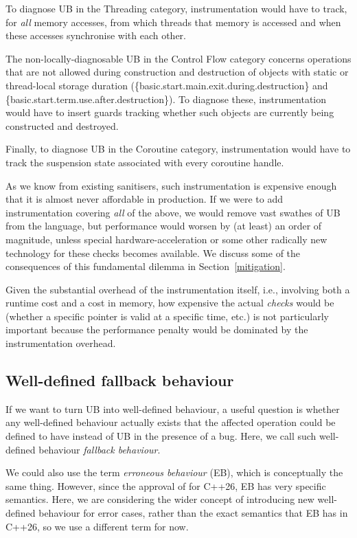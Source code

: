 To diagnose UB in the Threading category, instrumentation would have to track, for \emph{all} memory accesses, from which threads that memory is accessed and when these accesses synchronise with each other.

The non-locally-diagnosable UB in the Control Flow category concerns operations that are not allowed during construction and destruction of objects with static or thread-local storage duration (\{basic.start.main.exit.during.destruction\} and \{basic.start.term.use.after.destruction\}). To diagnose these, instrumentation would have to insert guards tracking whether such objects are currently being constructed and destroyed.  

Finally, to diagnose UB in the Coroutine category, instrumentation would have to track the suspension state associated with every coroutine handle.

As we know from existing sanitisers, such instrumentation is expensive enough that it is almost never affordable in production. If we were to add instrumentation covering \emph{all} of the above, we would remove vast swathes of UB from the language, but performance would worsen by (at least) an order of magnitude, unless special hardware-acceleration or some other radically new technology for these checks becomes available. We discuss some of the consequences of this fundamental dilemma in Section~\ref{mitigation}.

Given the substantial overhead of the instrumentation itself, i.e., involving both a runtime cost and a cost in memory, how expensive the actual \emph{checks} would be (whether a specific pointer is valid at a specific time, etc.) is not particularly important because the performance penalty would be dominated by the instrumentation overhead.

\subsection{Well-defined fallback behaviour}
\label{fallback}

If we want to turn UB into well-defined behaviour, a useful question is whether any well-defined behaviour actually exists that the affected operation could be defined to have instead of UB in the presence of a bug. Here, we call such well-defined behaviour \emph{fallback behaviour}.

We could also use the term \emph{erroneous behaviour} (EB), which is conceptually the same thing. However, since the approval of \cite{P2795R5} for C++26, EB has very specific semantics. Here, we are considering the wider concept of introducing new well-defined behaviour for error cases, rather than the exact semantics that EB has in C++26, so we use a different term for now.

